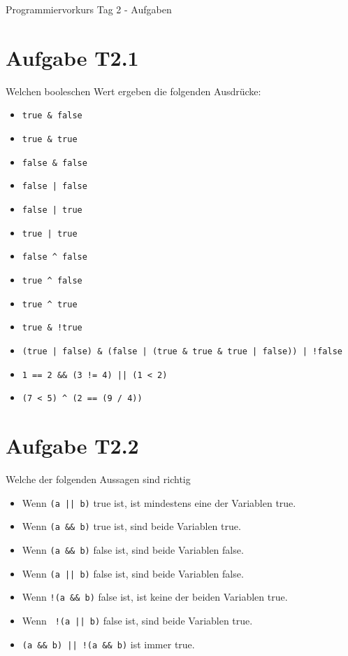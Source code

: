 \documentclass[final,a4paper]{article}
\begin{document}


{\huge Programmiervorkurs Tag 2 - Aufgaben}

\bigskip

\section*{Aufgabe T2.1}
	Welchen booleschen Wert ergeben die folgenden Ausdrücke:
	\begin{itemize}
		\item \lstinline{true & false}
		\item \lstinline{true & true}
		\item \lstinline{false & false}
		\item \lstinline{false | false}
		\item \lstinline{false | true}
		\item \lstinline{true | true}
		\item \lstinline{false ^ false}
		\item \lstinline{true ^ false}
		\item \lstinline{true ^ true}
		\item \lstinline{true & !true}
		\item \lstinline{(true | false) & (false | (true & true & true | false)) | !false}
		\item \lstinline{1 == 2 && (3 != 4) || (1 < 2)}
		\item \lstinline{(7 < 5) ^ (2 == (9 / 4))}
	\end{itemize}


\section*{Aufgabe T2.2}
Welche der folgenden Aussagen sind richtig
\begin{itemize}
\item Wenn \lstinline{(a || b)} true ist, ist mindestens eine der Variablen true.
\item Wenn \lstinline{(a && b)} true ist, sind beide Variablen true.
\item Wenn \lstinline{(a && b)} false ist, sind beide Variablen false.
\item Wenn \lstinline{(a || b)} false ist, sind beide Variablen false.
\item Wenn \lstinline{!(a && b)} false ist, ist keine der beiden Variablen true.
\item Wenn \lstinline{ !(a || b)} false ist, sind beide Variablen true.
\item \lstinline{(a && b) || !(a && b)} ist immer true.
\end{itemize}
\end{document}
